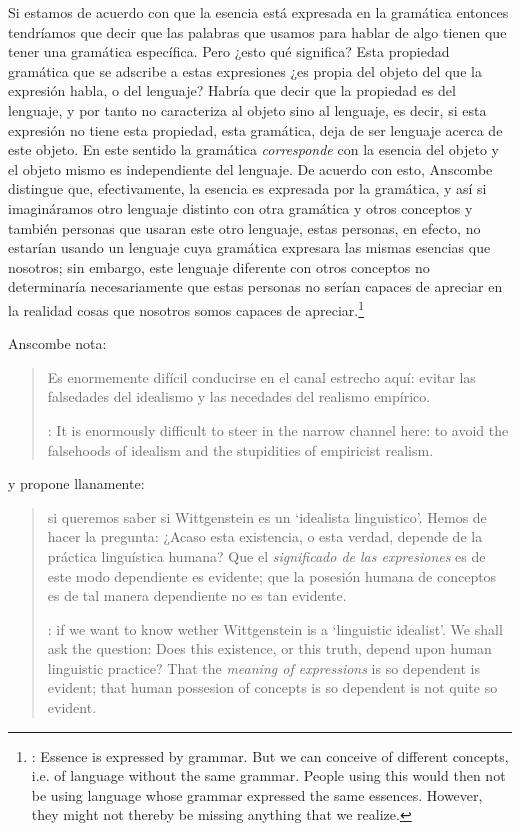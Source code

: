 Si estamos de acuerdo con que la esencia está expresada en la gramática entonces tendríamos que decir que las palabras que usamos para hablar de algo tienen que tener una gramática específica. Pero ¿esto qué significa? Esta propiedad gramática que se adscribe a estas expresiones ¿es propia del objeto del que la expresión habla, o del lenguaje? Habría que decir que la propiedad es del lenguaje, y por tanto no caracteriza al objeto sino al lenguaje, es decir, si esta expresión no tiene esta propiedad, esta gramática, deja de ser lenguaje acerca de este objeto. En este sentido la gramática \emph{corresponde} con la esencia del objeto y el objeto mismo es independiente del lenguaje. De acuerdo con esto, Anscombe distingue que, efectivamente, la esencia es expresada por la gramática, y así si imagináramos otro lenguaje distinto con otra gramática y otros conceptos y también personas que usaran este otro lenguaje, estas personas, en efecto, no estarían usando un lenguaje cuya gramática expresara las mismas esencias que nosotros; sin embargo, este lenguaje diferente con otros conceptos no determinaría necesariamente que estas personas no serían capaces de apreciar en la realidad cosas que nosotros somos capaces de apreciar.\footnote{\cite[Cf.~][115]{anscombe1981parmenides:qli}: Essence is expressed by grammar. But we can conceive of different concepts, i.e. of language without the same grammar. People using this would then not be using language whose grammar expressed the same essences. However, they might not thereby be missing anything that we realize.}

Anscombe nota: \blockquote[{\cite[115]{anscombe1981parmenides:qli}}: It is enormously difficult to steer in the narrow channel here: to avoid the falsehoods of idealism and the stupidities of empiricist realism.]{Es enormemente difícil conducirse en el canal estrecho aquí: evitar las falsedades del idealismo y las necedades del realismo empírico.} y propone llanamente: \blockquote[{\cite[116]{anscombe1981parmenides:qli}}: if we want to know wether Wittgenstein is a `linguistic idealist'. We shall ask the question: Does this existence, or this truth, depend upon human linguistic practice? That the \emph{meaning of expressions} is so dependent is evident; that human possesion of concepts is so dependent is not quite so evident.]{si queremos saber si Wittgenstein es un `idealista linguistico'. Hemos de hacer la pregunta: ¿Acaso esta existencia, o esta verdad, depende de la práctica linguística humana? Que el \emph{significado de las expresiones} es de este modo dependiente es evidente; que la posesión humana de conceptos es de tal manera dependiente no es tan evidente.}

